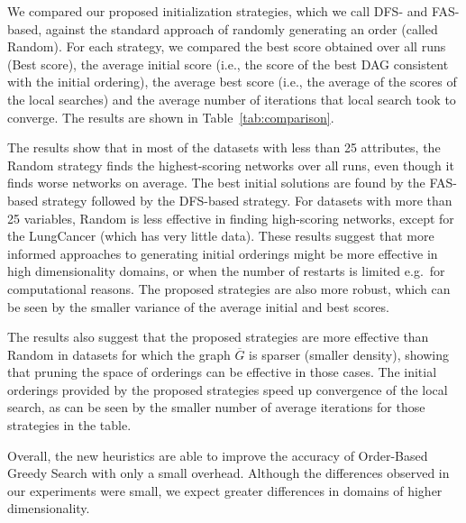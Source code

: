 We compared our proposed initialization strategies, which we call DFS- and FAS-based, against the standard approach of randomly generating an order (called Random). For each strategy, we compared the best score obtained over all runs (Best score), the average initial score (i.e., the score of the best DAG consistent with the initial ordering), the average best score (i.e., the average of the scores of the local searches) and the average number of iterations that local search took to converge. The results are shown in Table~\ref{tab:comparison}.
	
The results show that in most of the datasets with less than 25 attributes, the Random strategy finds the highest-scoring networks over all runs, even though it finds worse networks on average. The best initial solutions are found by the FAS-based strategy followed by the DFS-based strategy. For datasets with more than 25 variables, Random is less effective in finding high-scoring networks, except for the LungCancer (which has very little data). These results suggest that more informed approaches to generating initial orderings might be more effective in high dimensionality domains, or when the number of restarts is limited e.g.~for computational reasons. The proposed strategies are also more robust, which can be seen by the smaller variance of the average initial and best scores. 

The results also suggest that the proposed strategies are more effective than Random in datasets for which the graph $\overline G$ is sparser (smaller  density), showing that pruning the space of orderings can be effective in those cases. The initial orderings provided by the proposed strategies speed up convergence of the local search, as can be seen by the smaller number of average iterations for those strategies in the table.

Overall, the new heuristics are able to improve the accuracy of Order-Based Greedy Search with only a small overhead. Although the differences observed in our experiments were small, we expect greater differences in domains of higher dimensionality.

% 
